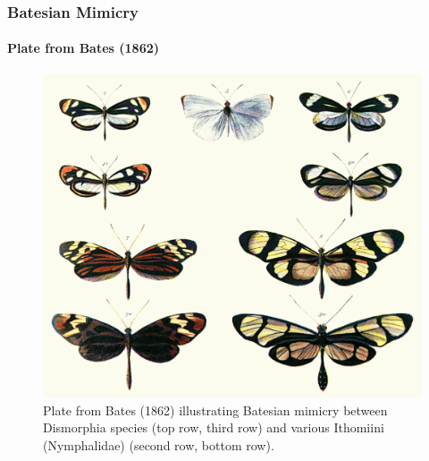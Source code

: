 \frame
{
	\frametitle{Batesian Mimicry}
	\framesubtitle{Plate from Bates (1862)}
	
	\begin{figure}[H]
		\centering
		\includegraphics[scale=0.6]{../tex/images/Batesplate_ArM}
		\caption{Plate from Bates (1862) illustrating Batesian mimicry between Dismorphia species (top row, third row) and various Ithomiini (Nymphalidae) (second row, bottom row).}
		\label{fig:batesian-butterfly}
	\end{figure}
}

%	

